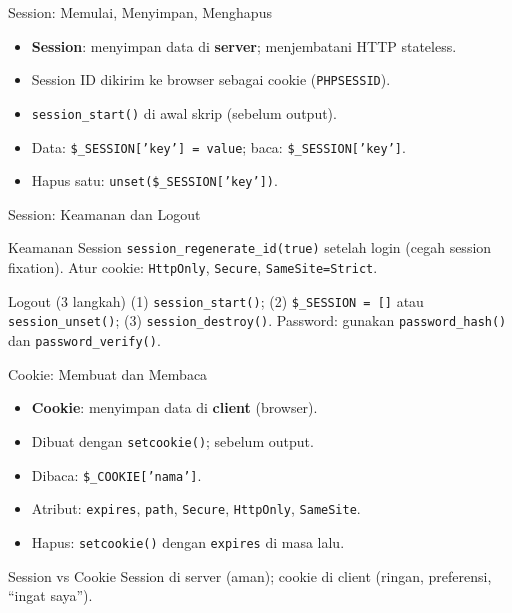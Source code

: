\documentclass[handout]{beamer}
\begin{document}
\begin{frame}{Session: Memulai, Menyimpan, Menghapus}
	\begin{itemize}
		\item \textbf{Session}: menyimpan data di \textbf{server}; menjembatani HTTP stateless.
		\item Session ID dikirim ke browser sebagai cookie (\texttt{PHPSESSID}).
		\item \texttt{session\_start()} di awal skrip (sebelum output).
		\item Data: \texttt{\$\_SESSION['key'] = value}; baca: \texttt{\$\_SESSION['key']}.
		\item Hapus satu: \texttt{unset(\$\_SESSION['key'])}.
	\end{itemize}
\end{frame}

\begin{frame}{Session: Keamanan dan Logout}
	\begin{block}{Keamanan Session}
		\texttt{session\_regenerate\_id(true)} setelah login (cegah session fixation). Atur cookie: \texttt{HttpOnly}, \texttt{Secure}, \texttt{SameSite=Strict}.
	\end{block}
	\begin{block}{Logout (3 langkah)}
		(1) \texttt{session\_start()}; (2) \texttt{\$\_SESSION = []} atau \texttt{session\_unset()}; (3) \texttt{session\_destroy()}. Password: gunakan \texttt{password\_hash()} dan \texttt{password\_verify()}.
	\end{block}
\end{frame}

\begin{frame}{Cookie: Membuat dan Membaca}
	\begin{itemize}
		\item \textbf{Cookie}: menyimpan data di \textbf{client} (browser).
		\item Dibuat dengan \texttt{setcookie()}; sebelum output.
		\item Dibaca: \texttt{\$\_COOKIE['nama']}.
		\item Atribut: \texttt{expires}, \texttt{path}, \texttt{Secure}, \texttt{HttpOnly}, \texttt{SameSite}.
		\item Hapus: \texttt{setcookie()} dengan \texttt{expires} di masa lalu.
	\end{itemize}
	\begin{block}{Session vs Cookie}
		Session di server (aman); cookie di client (ringan, preferensi, ``ingat saya'').
	\end{block}
\end{frame}
\end{document}
